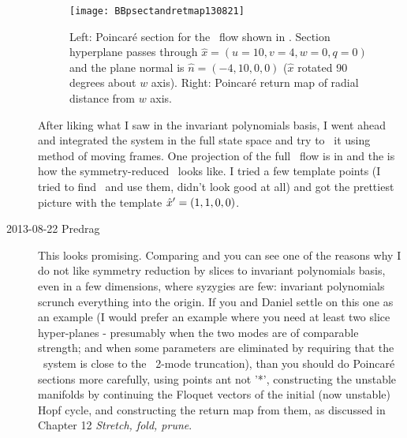 \begin{description}

\begin{figure}%
  \begin{center}
  \texttt{[image: BBpsectandretmap130821]}
  \end{center}
  \caption{Left: Poincar\'e section for the \twoMode\ flow shown in
  . Section hyperplane passes
  through $\hat{x} = (u=10, v=4, w=0, q=0)$ and the plane normal is
  $\hat{n} = (-4,10,0,0)$ ($\hat{x}$ rotated 90 degrees about $w$
  axis). Right: Poincar\'e return map of radial distance from $w$
  axis.}
  \label{fig:BBpsectandretmap130821}
\end{figure}

After liking what I saw in the invariant polynomials basis, I went ahead and integrated the system in the full state space and try to \slice\ it using method of moving frames. One projection of the full \statesp\ flow is in  and the  is how the symmetry-reduced \statesp\ looks like.
I tried a few template points (I tried to find \eqva\ and use them, didn't look good at all) and got the prettiest picture with the template ${\hat{x}'} = (1,1,0,0)$.



\item[2013-08-22 Predrag] This looks promising. Comparing
and
you can see one of the reasons why I do not like symmetry reduction by
slices to invariant polynomials basis, even in a few dimensions, where
syzygies are few: invariant polynomials scrunch everything into the
origin. If you and Daniel settle on this one as an example (I would
prefer an example where you need at least two slice hyper-planes -
presumably when the two modes are of comparable strength; and when
some parameters are eliminated by requiring that the \twoMode\ system
is close to the \KS\ 2-mode truncation), than you should do
Poincar\'e sections more carefully, using points ant not '*',
constructing the unstable manifolds by continuing the Floquet vectors
of the initial (now unstable) Hopf cycle, and constructing the return
map from them, as discussed in
{Chapter 12} {\em Stretch, fold, prune}.


\end{description}
